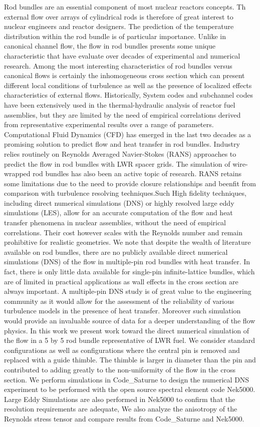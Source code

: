 \documentclass[11pt,letterpaper,english]{article}
\begin{document}
Rod bundles are an essential component of most nuclear reactors concepts. Th external flow over arrays of cylindrical rods is therefore of great interest to nuclear engineers and reactor designers. The prediction of the temperature distribution within the rod bundle is of particular importance. Unlike in canonical channel flow, the flow in rod bundles presents some unique characteristic that have evaluate over decades of  experimental and numerical research. Among the most interesting characteristics of rod bundles versus canonical flows is certainly the inhomogeneous cross section which can present different local conditions of turbulence as well as the presence of localized effects characteristics of external flows.
Historically, System codes and subchannel codes have been extensively used in the thermal-hydraulic analysis of reactor fuel assemblies, but they are limited by the need of empirical correlations derived from representative experimental results over a range of parameters.
Computational Fluid Dynamics (CFD) has emerged in the last two decades as a promising solution to predict flow and heat transfer in rod bundles.
Industry relies routinely on Reynolds Averaged Navier-Stokes (RANS) approaches to predict the flow in rod bundles with LWR spacer grids. The simulation of wire-wrapped rod bundles has also been an active topic of research. RANS retains some limitations due to the need to provide closure relationships and beenfit from comparison with turbulence resolving techniques.Such High fidelity techniques, including direct numerical simulations (DNS) or highly resolved large eddy simulations (LES), allow for an accurate computation of the flow and heat transfer phenomena in nuclear assemblies, without the need of empirical correlations. Their cost however scales with the Reynolds number and remain prohibitive for realistic geometries.
We note that despite the wealth of literature available on rod bundles, there are no publicly available direct numerical simulations (DNS) of the flow in multiple-pin rod bundles with heat transfer. In fact, there is only little data available for single-pin infinite-lattice bundles, which are of limited in practical applications as wall effects in the cross section are always important. A multiple-pin DNS study is of great value to the engineering community  as it would allow for the assessment of the reliability of various turbulence models in the presence of heat transfer. Moreover such simulation would provide an invaluable source of data for a deeper understanding of the flow physics.
In this work we present work toward the direct numerical simulation of the flow in a 5 by 5 rod bundle representative of LWR fuel. We consider standard configurations as well as configurations where the central pin is removed and replaced with a guide thimble. The thimble is larger in diameter than the pin and contributed to adding greatly to the non-uniformity of the flow in the cross section. We perform simulations in Code\_Saturne to design the numerical DNS experiment to be performed with the open source spectral element code Nek5000. Large Eddy Simulations are also performed in Nek5000 to confirm that the resolution requirements are adequate,   We also analyze the anisotropy of the Reynolds stress tensor and compare results from Code\_Saturne and Nek5000.
\end{document}

